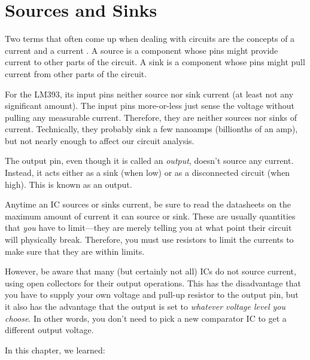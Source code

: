 

\section{Sources and Sinks}

Two terms that often come up when dealing with circuits are the concepts of a current  and a current .
A source is a component whose pins might provide current to other parts of the circuit.
A sink is a component whose pins might pull current from other parts of the circuit.

For the LM393, its input pins neither source nor sink current (at least not any significant amount).
The input pins more-or-less just sense the voltage without pulling any measurable current.
Therefore, they are neither sources nor sinks of current.
Technically, they probably sink a few nanoamps (billionths of an amp), but not nearly enough to affect our circuit analysis.

The output pin, even though it is called an \emph{output}, doesn't source any current.  
Instead, it acts either as a sink (when low) or as a disconnected circuit (when high).
This is known as an  output.

Anytime an IC sources or sinks current, be sure to read the datasheets on the maximum amount of current it can source or sink.
These are usually quantities that \emph{you} have to limit---they are merely telling you at what point their circuit will physically break.
Therefore, you must use resistors to limit the currents to make sure that they are within limits.

However, be aware that many (but certainly not all) ICs do not source current, using open collectors for their output operations.
This has the disadvantage that you have to supply your own voltage and pull-up resistor to the output pin, but it also has the advantage that the output is set to \emph{whatever voltage level you choose}.
In other words, you don't need to pick a new comparator IC to get a different output voltage.

\reviewsection

In this chapter, we learned:

